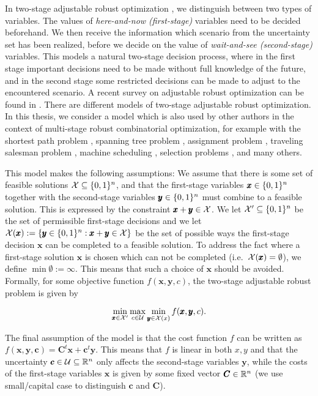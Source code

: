 In two-stage adjustable robust optimization \cite{ben2004adjustable}, we distinguish between two types of variables. The values of \emph{here-and-now (first-stage)} variables need to be decided beforehand. We then receive the information which scenario from the uncertainty set has been realized, before we decide on the value of \emph{wait-and-see (second-stage)} variables. 
This models a natural two-stage decision process, where in the first stage important decisions need to be made without full knowledge of the future, and in the second stage some restricted decisions can be made to adjust to the encountered scenario.
 A recent survey on adjustable robust optimization can be found in \cite{yanikouglu2019survey}.
There are different models of two-stage adjustable robust optimization. In this thesis, we consider a model which is also used by other authors in the context of multi-stage robust combinatorial optimization, for example with the shortest path problem \cite{busing2012paths}, spanning tree problem \cite{hradovich2017recoverable}, assignment problem \cite{fischer2020investigation}, traveling salesman problem \cite{goerigk2021recoverable},
machine scheduling \cite{bold2022investigating,bold2022algorithmic}, selection problems \cite{goerigk2023optimal,goerigk2022two,kasperski2015robust}, and many others. 

This model makes the following assumptions: We assume that there is some set of feasible solutions $\mathcal{X} \subseteq \{ 0,1 \}^n$, and that the first-stage variables $\pmb x \in \{ 0,1 \}^n$ together with the second-stage variables $\pmb y \in \{ 0,1 \}^n$ must combine to a feasible solution. This is expressed by the constraint $\pmb x + \pmb y \in \mathcal{X}$. 
We let $\mathcal{X}' \subseteq \{ 0,1 \}^n$ be the set of permissible first-stage decisions and we let $\mathcal{X}(\pmb x) := \{ \pmb y \in \{ 0,1 \}^n : \pmb x + \pmb y \in \mathcal{X} \}$ be the set of possible ways the first-stage decision $\pmb x$ can be completed to a feasible solution. 
To address the fact where a first-stage solution $\pmb x$ is chosen which can not be completed (i.e.\ $\mathcal{X}(\pmb x) = \emptyset$), we define $\min \emptyset := \infty$. This means that such a choice of $\pmb x$ should be avoided. Formally, for some objective function $f(\pmb x,\pmb y,c)$, the two-stage adjustable robust problem is given by

\[\min_{\pmb x \in \mathcal{X}'} \max_{c \in \mathcal{U}} \min_{\pmb y \in \mathcal{X}(x)} f(\pmb x,\pmb y,c).\]

The final assumption of the model is that the cost function $f$ can be written as  $f(\pmb x,\pmb y,\pmb c) = \pmb C^t \pmb x + \pmb c^t \pmb y$. This means that $f$ is linear in both $x,y$ and that the uncertainty $\pmb c \in \mathcal{U} \subseteq \mathbb{R}^n$ only affects the second-stage variables $\pmb y$, while the costs of the first-stage variables $\pmb x$ is given by some fixed vector $\pmb C \in \mathbb{R}^n$ (we use small/capital case to distinguish $\pmb c$ and $\pmb C$). 

